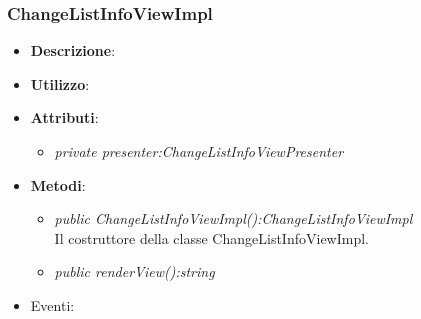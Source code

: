 \subsubsection{ChangeListInfoViewImpl}
\begin{itemize}
\item \textbf{Descrizione}: 
\item \textbf{Utilizzo}:
\item \textbf{Attributi}: 
	\begin{itemize}
	\item \textit{private presenter:ChangeListInfoViewPresenter}\\
	
	\end{itemize}
\item \textbf{Metodi}:
	\begin{itemize}
	\item \textit{public ChangeListInfoViewImpl():ChangeListInfoViewImpl}\\
	Il costruttore della classe ChangeListInfoViewImpl.	
	\item \textit{public renderView():string}\\

	\end{itemize}
\item{Eventi}:
\end{itemize}

